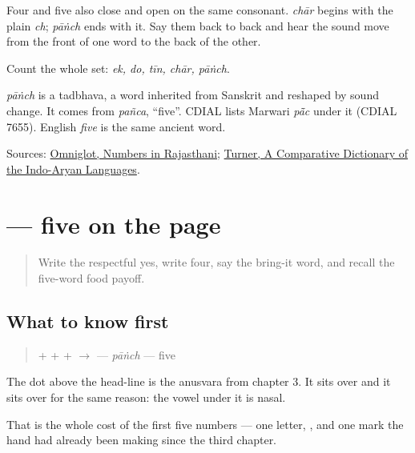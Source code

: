 Four and five also close and open on the same consonant. \emph{chār} begins with the plain \emph{ch}; \emph{pāṅch} ends with it. Say them back to back and hear the sound move from the front of one word to the back of the other.

Count the whole set: \emph{ek, do, tīn, chār, pāṅch}.

\begin{cousinweb}
\emph{pāṅch} is a tadbhava, a word inherited from Sanskrit and reshaped by sound change. It comes from \emph{pañca}, \textquotedblleft{}five\textquotedblright{}. CDIAL lists Marwari \emph{pā̃c} under it (CDIAL 7655). English \emph{five} is the same ancient word.
\end{cousinweb}

\begin{tcolorbox}[breakable,colback=teal!4,colframe=teal!35!black,title={Before you move on}]
Sources: \href{https://www.omniglot.com/language/numbers/rajasthani.htm}{Omniglot, Numbers in Rajasthani}; \href{https://dsal.uchicago.edu/dictionaries/soas/}{Turner, A Comparative Dictionary of the Indo-Aryan Languages}.
\end{tcolorbox}
\section[\texorpdfstring{\mw{पांच} (pāṅch)}{पांच (pāṅch)}]{ — five on the page}

\label{lesson:MW-C32-paanch}



\begin{quote}
Write the respectful yes, write four, say the bring-it word, and recall the five-word food payoff.
\end{quote}

\subsection*{What to know first}
\begin{quote}
\textbf{} + \textbf{} + \textbf{} + \textbf{} $\to$ \textbf{} — \emph{pāṅch} — five
\end{quote}

The dot above the head-line is the anusvara from chapter 3. It sits over \textbf{} and it sits over \textbf{} for the same reason: the vowel under it is nasal.

That is the whole cost of the first five numbers — one letter, \textbf{}, and one mark the hand had already been making since the third chapter.

